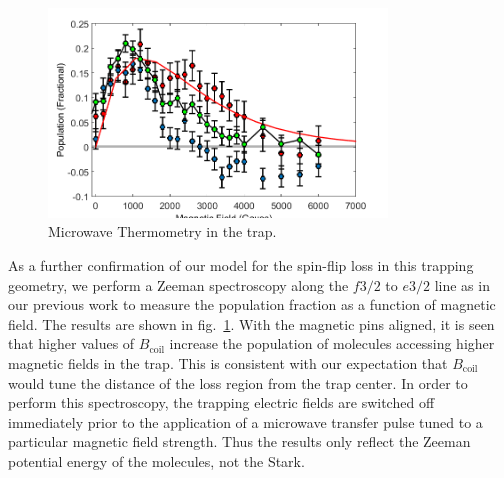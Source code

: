 \documentclass[%
 reprint,
 amsmath,amssymb,
 aps,
prl,
]{revtex4-1}
\begin{document}
\begin{figure}
\includegraphics[width=90mm]{MW-thermometry.png}%
\caption{
Microwave Thermometry in the trap.
\label{fig:spec}}
\end{figure}

As a further confirmation of our model for the spin-flip loss in this trapping geometry, we perform a Zeeman spectroscopy along the $f 3/2$ to $e 3/2$ line as in our previous work \cite{?} to measure the population fraction as a function of magnetic field. The results are shown in fig.~\ref{fig:spec}. With the magnetic pins aligned, it is seen that higher values of $B_{\text{coil}}$ increase the population of molecules accessing higher magnetic fields in the trap. This is consistent with our expectation that $B_\text{coil}$ would tune the distance of the loss region from the trap center. In order to perform this spectroscopy, the trapping electric fields are switched off immediately prior to the application of a microwave transfer pulse tuned to a particular magnetic field strength. Thus the results only reflect the Zeeman potential energy of the molecules, not the Stark. 


\nocite{*}


\end{document}
